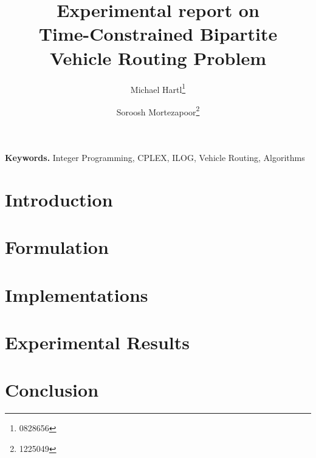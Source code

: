 \documentclass[fancy]{article}
\title{\vspace{-15mm}Experimental report on \vspace{5mm} \\
\fontsize{24pt}{10pt}\selectfont\textbf{Time-Constrained Bipartite Vehicle Routing Problem}}
\author[1]{Michael Hartl\thanks{0828656}}
\author[1]{Soroosh Mortezapoor\thanks{1225049}}
\affil[1]{Vienna University of Technology}
\date{}
\begin{document}
\maketitle %
\begin{abstract}

\end{abstract}


\thispagestyle{fancy} %








\smallskip
\noindent \textbf{Keywords.} Integer Programming, CPLEX, ILOG, Vehicle Routing,
Algorithms




\section{Introduction}


\section{Formulation}


\section{Implementations}


\section{Experimental Results}


\section{Conclusion}




 

\end{document}
